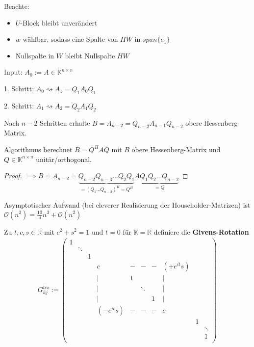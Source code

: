 Beachte: \begin{itemize}
	\item $U$-Block bleibt unverändert
	\item $w$ wählbar, sodass eine Spalte von $HW$ in $span\{e_1\}$
	\item Nullspalte in $W$ bleibt Nullspalte $HW$
\end{itemize}

\begin{algorithm}
	Input: $A_0 := A \in \mathbb{K}^{n\times n}$
	
	1. Schritt: $A_0 \rightsquigarrow A_1 = Q_1A_0Q_1$
	
	2. Schritt: $A_1 \rightsquigarrow A_2 = Q_2A_1Q_2$
	
	Nach $n-2$ Schritten erhalte $B = A_{n-2} = Q_{n-2}A_{n-1}Q_{n-2}$ obere Hessenberg-Matrix.
\end{algorithm}

\begin{theorem}
	Algorithmus berechnet $B=Q^HAQ$ mit $B$ obere Hessenberg-Matrix und $Q \in \mathbb{K}^{n\times n}$ unitär/orthogonal.
\end{theorem}

\begin{proof}
	$\implies B = A_{n-2} = \underbrace{Q_{n-2}Q_{n-3} ... Q_2Q_1}_{=(Q_1...Q_{n-2})^H=Q^H}A\underbrace{Q_1Q_2 ... Q_{n-2}}_{=Q}$
\end{proof}

\begin{remark}
	Asymptotischer Aufwand (bei cleverer Realisierung der Householder-Matrizen) ist $\mathcal{O}(n^3) = \frac{10}{3}n^3 + \mathcal{O}(n^2)$
\end{remark}

\begin{definition}
	Zu $t,c,s \in \mathbb{R}$ mit $c^2 + s^2 = 1$ und $t=0$ für $\mathbb{K} = \mathbb{R}$ definiere die \textbf{Givens-Rotation}
	\begin{align*}
		G_{kj}^{tcs} := \left(\begin{matrix}
			1\\
			& \ddots\\
			& & 1\\
			& & & c & - & - & - & (+ e^{it}s)\\
			& & & | & 1 & & & |\\
			& & & | & & \ddots & & |\\
			& & & | & & & 1 & |\\
			& & & (-e^{it}s) & - & - & - & c\\
			& & & & & & & & 1\\
			& & & & & & & & & \ddots\\
			& & & & & & & & & 1 \\
		\end{matrix}\right)
	\end{align*}
\end{definition}

